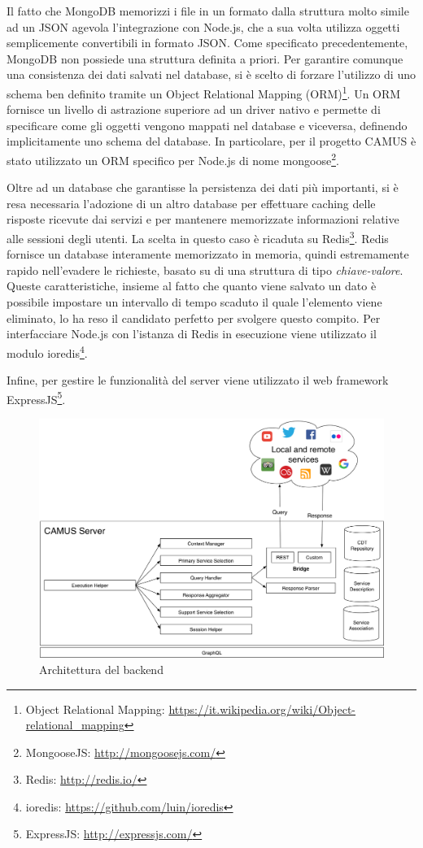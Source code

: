 Il fatto che MongoDB memorizzi i file in un formato dalla struttura molto simile ad un JSON agevola l'integrazione con Node.js, che a sua volta utilizza oggetti semplicemente convertibili in formato JSON. Come specificato precedentemente, MongoDB non possiede una struttura definita a priori. Per garantire comunque una consistenza dei dati salvati nel database, si è scelto di forzare l'utilizzo di uno schema ben definito tramite un Object Relational Mapping (ORM)\footnote{Object Relational Mapping: \url{https://it.wikipedia.org/wiki/Object-relational_mapping}}. Un ORM fornisce un livello di astrazione superiore ad un driver nativo e permette di specificare come gli oggetti vengono mappati nel database e viceversa, definendo implicitamente uno schema del database. In particolare, per il progetto CAMUS è stato utilizzato un ORM specifico per Node.js di nome mongoose\footnote{MongooseJS: \url{http://mongoosejs.com/}}.

Oltre ad un database che garantisse la persistenza dei dati più importanti, si è resa necessaria l'adozione di un altro database per effettuare  caching delle risposte ricevute dai servizi e per mantenere memorizzate informazioni relative alle sessioni degli utenti. La scelta in questo caso è ricaduta su Redis\footnote{Redis: \url{http://redis.io/}}. Redis fornisce un database interamente memorizzato in memoria, quindi estremamente rapido nell'evadere le richieste, basato su di una struttura di tipo \emph{chiave-valore}. Queste caratteristiche, insieme al fatto che quanto viene salvato un dato è possibile impostare un intervallo di tempo scaduto il quale l'elemento viene eliminato, lo ha reso il candidato perfetto per svolgere questo compito. Per interfacciare Node.js con l'istanza di Redis in esecuzione viene utilizzato il modulo ioredis\footnote{ioredis: \url{https://github.com/luin/ioredis}}.

Infine, per gestire le funzionalità del server viene utilizzato il web framework ExpressJS\footnote{ExpressJS: \url{http://expressjs.com/}}.

\begin{figure}[ht]
	\centering
	\includegraphics[width=\textwidth]{5-implementazione-backend/Immagini/camus-architecture.png}
	\caption{Architettura del backend}\label{fig:architettura-backend}
\end{figure}


